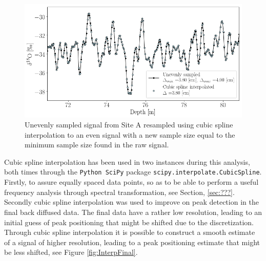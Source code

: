 \documentclass[../../CompleteThesis2/Complete_2ndDraft]{subfiles}
\begin{document}
\begin{figure}[h]
	\centering
	\includegraphics[width=\textwidth]{SiteA_DataSplineInterp.png}
	\caption[Even resampling of unevenly sampled data, Site A.]{\small Unevenly sampled signal from Site A resampled using cubic spline interpolation to an even signal with a new sample size equal to the minimum sample size found in the raw signal.}
	\label{Fig:COMPMETH_SiteA_DataSplineInterp}
\end{figure}

Cubic spline interpolation has been used in two instances during this analysis, both times through the \lstinline[language=Python]|Python SciPy| package \lstinline[language=Python]|scipy.interpolate.CubicSpline|. Firstly, to assure equally spaced data points, so as to be able to perform a useful frequency analysis through spectral transformation, see Section, \ref{sec:???}. Secondly cubic spline interpolation was used to improve on peak detection in the final back diffused data. The final data have a rather low resolution, leading to an initial guess of peak positioning that might be shifted due to the discretization. Through cubic spline interpolation it is possible to construct a smooth estimate of a signal of higher resolution, leading to a peak positioning estimate that might be less shifted, see Figure \ref{fig:InterpFinal}.
\end{document}
